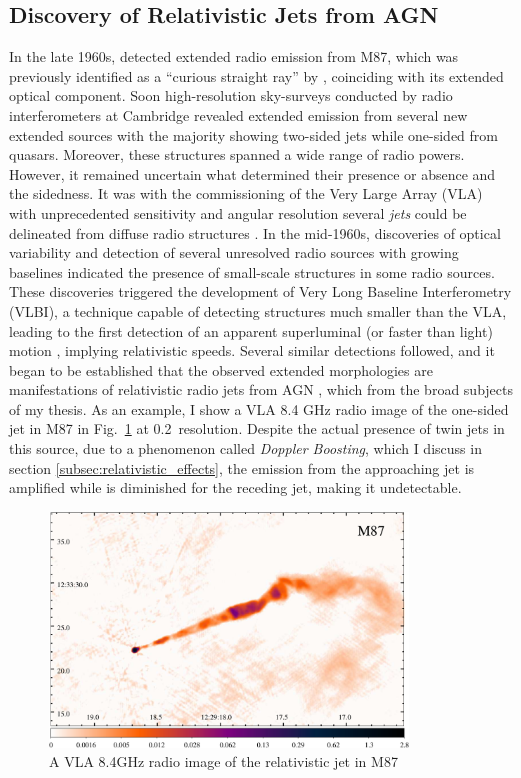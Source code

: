 \subsection{Discovery of Relativistic Jets from AGN}
In the late 1960s, \citet{hogg1969synthesis} detected extended radio emission from M87, which was previously identified as a ``curious straight ray'' by \citet{curtis1918descriptions}, coinciding with its extended optical component. Soon high-resolution sky-surveys conducted by radio interferometers at Cambridge revealed extended emission from several new extended sources \citep[e.g.,][]{1973MNRAS.165..369N,turland19753c} with the majority showing two-sided jets while one-sided from quasars. Moreover, these structures spanned a wide range of radio powers. However, it remained uncertain what determined their presence or absence and the sidedness. It was with the commissioning of the Very Large Array (VLA) with unprecedented sensitivity and angular resolution several \textit{jets} could be delineated from diffuse radio structures \citep[e.g.,][]{bridle1984extragalactic}. In the mid-1960s, discoveries of optical variability and detection of several unresolved radio sources with growing baselines indicated the presence of small-scale structures in some radio sources. These discoveries triggered the development of Very Long Baseline Interferometry (VLBI), a technique capable of detecting structures much smaller than the VLA, leading to the first detection of an apparent superluminal (or faster than light) motion \citep{whitney1971quasars,cohen1971small}, implying relativistic speeds. Several similar detections followed, and it began to be established that the observed extended morphologies are manifestations of relativistic radio jets from AGN \citep{blandford1979relativistic,konigl1980relativistic}, which from the broad subjects of my thesis. As an example, I show a VLA 8.4 GHz radio image of the one-sided jet in M87 in Fig.~\ref{fig:M87_showpiece} at 0.2\as~resolution. Despite the actual presence of twin jets in this source, due to a phenomenon called \textit{Doppler Boosting}, which I discuss in section \ref{subsec:relativistic_effects}, the emission from the approaching jet is amplified while is diminished for the receding jet, making it undetectable.
\begin{figure}
    \centering
    \includegraphics[width=0.849\textwidth]{images/misc/M87_thesis_showpeice-crop.pdf}
    \caption{A VLA 8.4GHz radio image of the relativistic jet in M87 \label{fig:M87_showpiece}}
\end{figure}

